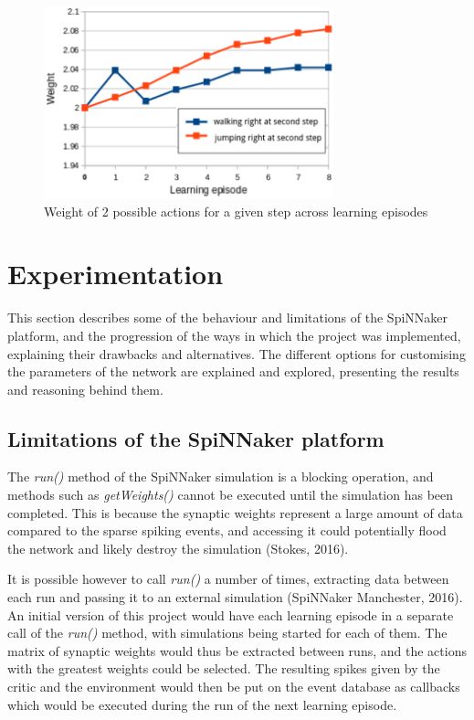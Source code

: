 \documentclass[10pt]{article}
\begin{document}
    \begin{figure}[ht!]
    \centering
    \includegraphics[width=84mm]{./learning.png}
    \caption{Weight of 2 possible actions for a given step across learning episodes}
    \label{fig:learning}
    \end{figure}

    \section{Experimentation}

    This section describes some of the behaviour and limitations of the SpiNNaker platform, and the progression of the ways in which the project was implemented, explaining their drawbacks and alternatives. The different options for customising the parameters of the network are explained and explored, presenting the results and reasoning behind them.

    \subsection{Limitations of the SpiNNaker platform}

    The \textit{run()} method of the SpiNNaker simulation is a blocking operation, and methods such as \textit{getWeights()} cannot be executed until the simulation has been completed. This is because the synaptic weights represent a large amount of data compared to the sparse spiking events, and accessing it could potentially flood the network and likely destroy the simulation (Stokes, 2016).

    It is possible however to call \textit{run()} a number of times, extracting data between each run and passing it to an external simulation (SpiNNaker Manchester, 2016). An initial version of this project would have each learning episode in a separate call of the \textit{run()} method, with simulations being started for each of them. The matrix of synaptic weights would thus be extracted between runs, and the actions with the greatest weights could be selected. The resulting spikes given by the critic and the environment would then be put on the event database as callbacks which would be executed during the run of the next learning episode.
    
\end{document}
